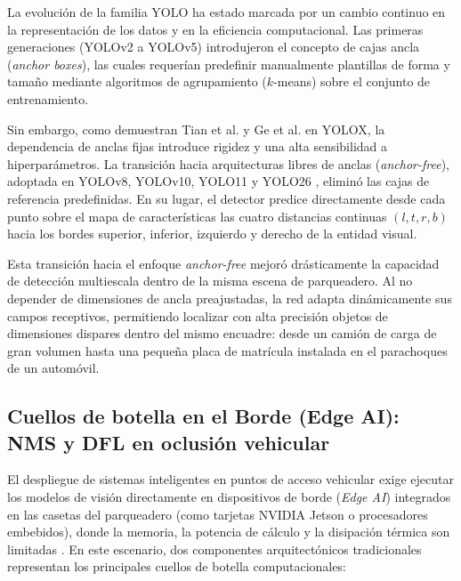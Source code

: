 La evolución de la familia YOLO ha estado marcada por un cambio continuo en la
representación de los datos y en la eficiencia computacional. Las primeras
generaciones (YOLOv2 a YOLOv5) \cite{redmon2016yolo} introdujeron el concepto de
cajas ancla (\textit{anchor boxes}), las cuales requerían predefinir manualmente
plantillas de forma y tamaño mediante algoritmos de agrupamiento ($k$-means)
sobre el conjunto de entrenamiento.

Sin embargo, como demuestran Tian et al. \cite{tian2019fcos} y Ge et al. en
YOLOX, la dependencia de anclas fijas introduce rigidez y una alta sensibilidad
a hiperparámetros. La transición hacia arquitecturas libres de anclas
(\textit{anchor-free}), adoptada en YOLOv8, YOLOv10, YOLO11 y YOLO26 
\cite{yolo11_ultralytics,sapkota2026yolo26, jocher2026yolo26}, eliminó las cajas de referencia
predefinidas. En su lugar, el detector predice directamente desde cada punto
sobre el mapa de características las cuatro distancias continuas $(l, t, r, b)$ 
hacia los bordes superior, inferior, izquierdo y derecho de la entidad visual.

Esta transición hacia el enfoque \textit{anchor-free} mejoró drásticamente la
capacidad de detección multiescala dentro de la misma escena de parqueadero. Al
no depender de dimensiones de ancla preajustadas, la red adapta dinámicamente
sus campos receptivos, permitiendo localizar con alta precisión objetos de
dimensiones dispares dentro del mismo encuadre: desde un camión de carga de gran
volumen hasta una pequeña placa de matrícula instalada en el parachoques de un
automóvil.

\subsection{Cuellos de botella en el Borde (Edge AI): NMS y DFL en oclusión vehicular}

El despliegue de sistemas inteligentes en puntos de acceso vehicular exige
ejecutar los modelos de visión directamente en dispositivos de borde
(\textit{Edge AI}) integrados en las casetas del parqueadero (como tarjetas
NVIDIA Jetson o procesadores embebidos), donde la memoria, la potencia de
cálculo y la disipación térmica son limitadas \cite{sapkota2026yolo26}. En este
escenario, dos componentes arquitectónicos tradicionales representan los
principales cuellos de botella computacionales:


